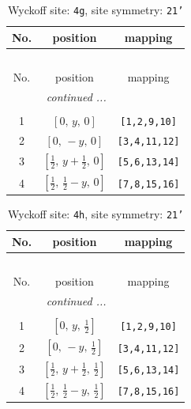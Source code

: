 \documentclass[fleqn,8pt]{jsarticle}
\begin{document}
\renewcommand{\arraystretch}{1.2}
\begin{longtable}{ccc}
\caption{Wyckoff site: {\tt 4g}, site symmetry: {\tt 21'}}
 \\
 \hline \hline
No. & position & mapping \\ \hline \endfirsthead

\multicolumn{2}{l}{\tablename\ \thetable{}} \\
 \hline \hline
No. & position & mapping \\ \hline \endhead

 \hline \hline
\multicolumn{2}{r}{\footnotesize\it continued ...} \\ \endfoot

 \hline \hline
\multicolumn{2}{r}{} \\ \endlastfoot

1 & $\left[ 0,\, y,\, 0 \right]$ & {\tt [1,2,9,10]} \\ \hline
2 & $\left[ 0,\, - y,\, 0 \right]$ & {\tt [3,4,11,12]} \\ \hline
3 & $\left[ \frac{1}{2},\, y + \frac{1}{2},\, 0 \right]$ & {\tt [5,6,13,14]} \\ \hline
4 & $\left[ \frac{1}{2},\, \frac{1}{2} - y,\, 0 \right]$ & {\tt [7,8,15,16]} \\
\end{longtable}
\renewcommand{\arraystretch}{1.2}
\begin{longtable}{ccc}
\caption{Wyckoff site: {\tt 4h}, site symmetry: {\tt 21'}}
 \\
 \hline \hline
No. & position & mapping \\ \hline \endfirsthead

\multicolumn{2}{l}{\tablename\ \thetable{}} \\
 \hline \hline
No. & position & mapping \\ \hline \endhead

 \hline \hline
\multicolumn{2}{r}{\footnotesize\it continued ...} \\ \endfoot

 \hline \hline
\multicolumn{2}{r}{} \\ \endlastfoot

1 & $\left[ 0,\, y,\, \frac{1}{2} \right]$ & {\tt [1,2,9,10]} \\ \hline
2 & $\left[ 0,\, - y,\, \frac{1}{2} \right]$ & {\tt [3,4,11,12]} \\ \hline
3 & $\left[ \frac{1}{2},\, y + \frac{1}{2},\, \frac{1}{2} \right]$ & {\tt [5,6,13,14]} \\ \hline
4 & $\left[ \frac{1}{2},\, \frac{1}{2} - y,\, \frac{1}{2} \right]$ & {\tt [7,8,15,16]} \\
\end{longtable}
\end{document}
